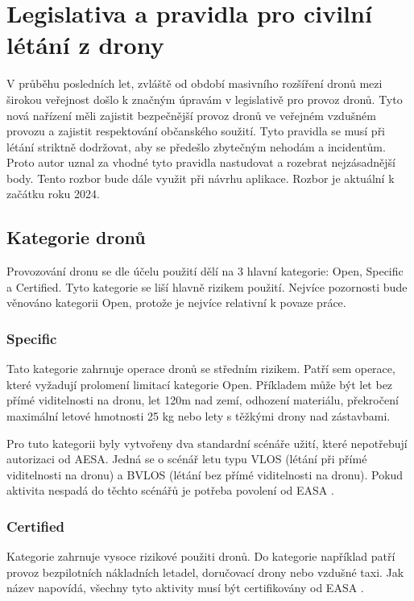 \newpage

\section{Legislativa a pravidla pro civilní létání z drony}
V průběhu posledních let, zvláště od období masivního rozšíření dronů mezi širokou veřejnost došlo k značným úpravám v legislativě pro provoz dronů. Tyto nová nařízení měli zajistit bezpečnější provoz dronů ve veřejném vzdušném provozu a zajistit respektování občanského soužití. Tyto pravidla se musí při létání striktně dodržovat, aby se předešlo zbytečným nehodám a incidentům. Proto autor uznal za vhodné tyto pravidla nastudovat a rozebrat nejzásadnější body. Tento rozbor bude dále využit při návrhu aplikace. Rozbor je aktuální k začátku roku 2024.

\subsection{Kategorie dronů}
Provozování dronu se dle účelu použití dělí na 3 hlavní kategorie: Open, Specific a Certified. Tyto kategorie se liší hlavně rizikem použití. Nejvíce pozornosti bude věnováno kategorii Open, protože je nejvíce relativní k povaze práce.

\subsubsection{Specific}
Tato kategorie zahrnuje operace dronů se středním rizikem. Patří sem operace, které vyžadují prolomení limitací kategorie Open. Příkladem může být let bez přímé viditelnosti na dronu, let 120m nad zemí, odhození materiálu, překročení maximální letové hmotnosti 25 kg nebo lety s těžkými drony nad zástavbami\cite{EASA:SpecificCategory}. 
    
Pro tuto kategorii byly vytvořeny dva standardní scénáře užití, které nepotřebují autorizaci od AESA. Jedná se o scénář letu typu VLOS (létání při přímé viditelnosti na dronu) a BVLOS (létání bez přímé viditelnosti na dronu). Pokud aktivita nespadá do těchto scénářů je potřeba povolení od EASA \cite{DroneKatogorySouhrn,EASA:SpecificCategory}.  
    

\subsubsection{Certified} 
Kategorie zahrnuje vysoce rizikové použiti dronů. Do kategorie například patří provoz bezpilotních nákladních letadel, doručovací drony nebo vzdušné taxi. Jak název napovídá, všechny tyto aktivity musí být certifikovány od EASA \cite{EASA:CertifiedCategory}.

